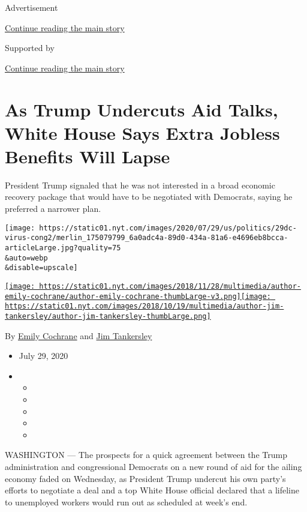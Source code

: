 Advertisement

\protect\hyperlink{after-top}{Continue reading the main story}

Supported by

\protect\hyperlink{after-sponsor}{Continue reading the main story}

\hypertarget{as-trump-undercuts-aid-talks-white-house-says-extra-jobless-benefits-will-lapse}{%
\section{As Trump Undercuts Aid Talks, White House Says Extra Jobless
Benefits Will
Lapse}\label{as-trump-undercuts-aid-talks-white-house-says-extra-jobless-benefits-will-lapse}}

President Trump signaled that he was not interested in a broad economic
recovery package that would have to be negotiated with Democrats, saying
he preferred a narrower plan.

\texttt{[image: https://static01.nyt.com/images/2020/07/29/us/politics/29dc-virus-cong2/merlin\_175079799\_6a0adc4a-89d0-434a-81a6-e4696eb8bcca-articleLarge.jpg?quality=75\\\&auto=webp\\\&disable=upscale]}

\href{https://www.nytimes.com/by/emily-cochrane}{\texttt{[image: https://static01.nyt.com/images/2018/11/28/multimedia/author-emily-cochrane/author-emily-cochrane-thumbLarge-v3.png]}}\href{https://www.nytimes.com/by/jim-tankersley}{\texttt{[image: https://static01.nyt.com/images/2018/10/19/multimedia/author-jim-tankersley/author-jim-tankersley-thumbLarge.png]}}

By \href{https://www.nytimes.com/by/emily-cochrane}{Emily Cochrane} and
\href{https://www.nytimes.com/by/jim-tankersley}{Jim Tankersley}

\begin{itemize}
\item
  July 29, 2020
\item
  \begin{itemize}
  \item
  \item
  \item
  \item
  \item
  \end{itemize}
\end{itemize}

WASHINGTON --- The prospects for a quick agreement between the Trump
administration and congressional Democrats on a new round of aid for the
ailing economy faded on Wednesday, as President Trump undercut his own
party's efforts to negotiate a deal and a top White House official
declared that a lifeline to unemployed workers would run out as
scheduled at week's end.


